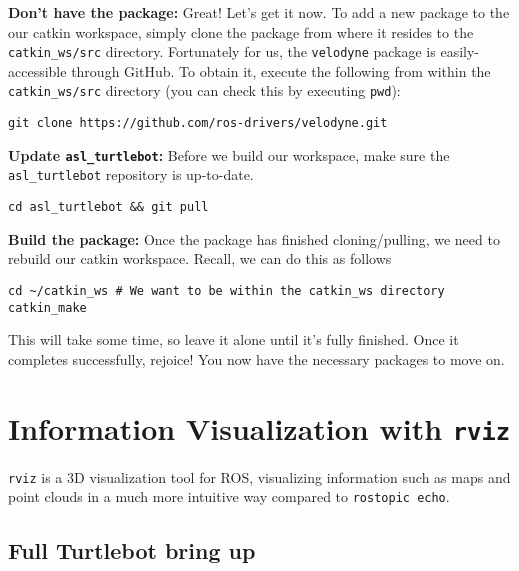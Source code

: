 \documentclass{article}
\begin{document}
{\bf Don't have the package:} Great! Let's get it now. To add a new package to the our catkin workspace, simply clone the package from where it resides to the \texttt{catkin\_ws/src} directory. Fortunately for us, the \texttt{velodyne} package is easily-accessible through GitHub. To obtain it, execute the following from within the \texttt{catkin\_ws/src} directory (you can check this by executing \texttt{pwd}):
\begin{lstlisting}
git clone https://github.com/ros-drivers/velodyne.git
\end{lstlisting}

{\bf Update \texttt{asl\_turtlebot}:} Before we build our workspace, make sure the {\tt asl\_turtlebot} repository is up-to-date.
\begin{lstlisting}
cd asl_turtlebot && git pull
\end{lstlisting}

{\bf Build the package:}
Once the package has finished cloning/pulling, we need to rebuild our catkin workspace. Recall, we can do this as follows
\begin{lstlisting}
cd ~/catkin_ws # We want to be within the catkin_ws directory
catkin_make
\end{lstlisting}

This will take some time, so leave it alone until it's fully finished. Once it completes successfully, rejoice! You now have the necessary packages to move on.

\section{Information Visualization with \texttt{rviz}}

\texttt{rviz} is a 3D visualization tool for ROS, visualizing information such as maps and point clouds in a much more intuitive way compared to \texttt{rostopic echo}.

\subsection{Full Turtlebot bring up}


\end{document}
